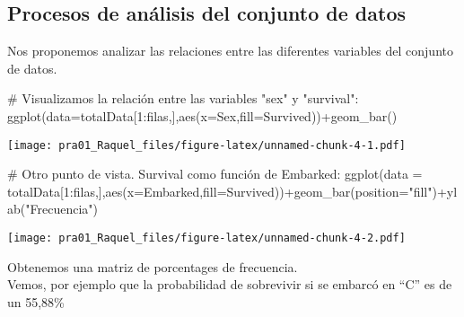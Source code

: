 \documentclass[]{article}
\newenvironment{Shaded}{\begin{snugshade}}{\end{snugshade}}
\newcommand{\CommentTok}[1]{\textcolor[rgb]{0.50,0.62,0.50}{#1}}
\newcommand{\ControlFlowTok}[1]{\textcolor[rgb]{0.94,0.87,0.69}{#1}}
\newcommand{\DataTypeTok}[1]{\textcolor[rgb]{0.87,0.87,0.75}{#1}}
\newcommand{\DecValTok}[1]{\textcolor[rgb]{0.86,0.86,0.80}{#1}}
\newcommand{\KeywordTok}[1]{\textcolor[rgb]{0.94,0.87,0.69}{#1}}
\newcommand{\NormalTok}[1]{\textcolor[rgb]{0.80,0.80,0.80}{#1}}
\newcommand{\OperatorTok}[1]{\textcolor[rgb]{0.94,0.94,0.82}{#1}}
\newcommand{\StringTok}[1]{\textcolor[rgb]{0.80,0.58,0.58}{#1}}
\begin{document}
\hypertarget{procesos-de-analisis-del-conjunto-de-datos}{%
\subsection{Procesos de análisis del conjunto de
datos}\label{procesos-de-analisis-del-conjunto-de-datos}}

Nos proponemos analizar las relaciones entre las diferentes variables
del conjunto de datos.

\begin{Shaded}
\begin{Highlighting}[]
\CommentTok{\# Visualizamos la relación entre las variables "sex" y "survival":}
\KeywordTok{ggplot}\NormalTok{(}\DataTypeTok{data=}\NormalTok{totalData[}\DecValTok{1}\OperatorTok{:}\NormalTok{filas,],}\KeywordTok{aes}\NormalTok{(}\DataTypeTok{x=}\NormalTok{Sex,}\DataTypeTok{fill=}\NormalTok{Survived))}\OperatorTok{+}\KeywordTok{geom\_bar}\NormalTok{()}
\end{Highlighting}
\end{Shaded}

\texttt{[image: pra01\_Raquel\_files/figure-latex/unnamed-chunk-4-1.pdf]}

\begin{Shaded}
\begin{Highlighting}[]
\CommentTok{\# Otro punto de vista. Survival como función de Embarked:}
\KeywordTok{ggplot}\NormalTok{(}\DataTypeTok{data =}\NormalTok{ totalData[}\DecValTok{1}\OperatorTok{:}\NormalTok{filas,],}\KeywordTok{aes}\NormalTok{(}\DataTypeTok{x=}\NormalTok{Embarked,}\DataTypeTok{fill=}\NormalTok{Survived))}\OperatorTok{+}\KeywordTok{geom\_bar}\NormalTok{(}\DataTypeTok{position=}\StringTok{"fill"}\NormalTok{)}\OperatorTok{+}\KeywordTok{ylab}\NormalTok{(}\StringTok{"Frecuencia"}\NormalTok{)}
\end{Highlighting}
\end{Shaded}

\texttt{[image: pra01\_Raquel\_files/figure-latex/unnamed-chunk-4-2.pdf]}

Obtenemos una matriz de porcentages de frecuencia.\\
Vemos, por ejemplo que la probabilidad de sobrevivir si se embarcó en
``C'' es de un 55,88\%

\begin{Shaded}
\end{Shaded}
\end{document}
